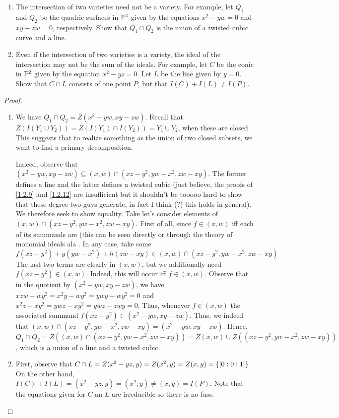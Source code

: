 \label{1.2.16}

\begin{enumerate}[label = (\alph*)]
    \item The intersection of two varieties need not be a variety. For example, let $Q_1$ and $Q_2$ be the quadric surfaces in $\P^3$ given by the equations $x^2 - yw = 0$ and $xy - zw = 0$, respectively. Show that $Q_1 \cap Q_2$ is the union of a twisted cubic curve and a line.
    
    \item Even if the intersection of two varieties is a variety, the ideal of the intersection may not be the sum of the ideals. For example, let $C$ be the conic in $\P^2$ given by the equation $x^2 - yz = 0$. Let $L$ be the line given by $y = 0$. Show that $C \cap L$ consists of one point $P$, but that $I(C) + I(L) \neq I(P)$.
\end{enumerate}

\begin{proof}
    \begin{enumerate}[label = (\alph*)]
        \item We have $Q_1 \cap Q_2 = Z(x^2 - yw, xy - zw)$. Recall that $Z(I(Y_1 \cup Y_2)) = Z(I(Y_1) \cap I(Y_2)) = Y_1 \cup Y_2$, when these are closed. This suggests that to realize something as the union of two closed subsets, we want to find a primary decomposition.

        Indeed, observe that $(x^2 - yw, xy - zw) \subseteq (x, w) \cap (xz - y^2, yw - x^2, zw - xy)$. The former defines a line and the latter defines a twisted cubic (just believe, the proofs of \ref{1.2.9} and \ref{1.2.12} are insufficient but it shouldn't be tooooo hard to show that these degree two guys generate, in fact I think (?) this holds in general). We therefore seek to show equality. Take let's consider elements of $(x, w) \cap (xz - y^2, yw - x^2, zw - xy)$. First of all, since $f \in (x, w)$ iff each of its summands are (this can be seen directly or through the theory of monomial ideals ala \cite{cox-ideals}. In any case, take some $f (xz - y^2) + g(yw - x^2) + h(zw - xy) \in (x, w) \cap (xz - y^2, yw - x^2, zw - xy)$ The last two terms are clearly in $(x, w)$, but we additionally need $f (xz - y^2) \in (x, w)$. Indeed, this will occur iff $f \in (x, w)$. Observe that in the quotient by $(x^2 - yw, xy - zw)$, we have $xzw - wy^2 = x^2 y - wy^2 = ywy - wy^2 = 0$ and $x^2 z - xy^2 = ywz - xy^2 = ywz - zwy = 0$. Thus, whenever $f \in (x, w)$ the associated summand $f(xz - y^2) \in (x^2 - yw, xy - zw)$. Thus, we indeed that $(x, w) \cap (xz - y^2, yw - x^2, zw - xy) = (x^2 - yw, xy - zw)$. Hence, $Q_1 \cap Q_2 = Z((x, w) \cap (xz - y^2, yw - x^2, zw - xy)) = Z(x, w) \cup Z((xz - y^2, yw - x^2, zw - xy))$, which is a union of a line and a twisted cubic.

        \item First, observe that $C \cap L = Z(x^2 - yz, y) = Z(x^2, y) = Z(x, y) = \curly{[0 : 0 : 1]}$. On the other hand, $I(C) + I(L) = (x^2 - yz, y) = (x^2, y) \neq (x, y) = I(P)$. Note that the equations given for $C$ an $L$ are irreducible so there is no fuss.
    \end{enumerate}    
\end{proof}
